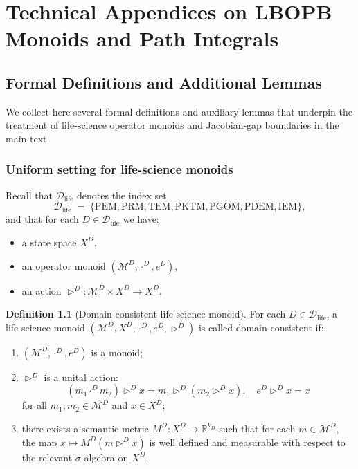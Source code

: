 \documentclass[11pt]{book}
\theoremstyle{plain}
\theoremstyle{definition}
\newtheorem{definition}[theorem]{Definition}
\theoremstyle{remark}
\begin{document}
\appendix

\chapter{Technical Appendices on LBOPB Monoids and Path Integrals}


\section{Formal Definitions and Additional Lemmas}


We collect here several formal definitions and auxiliary lemmas that
underpin the treatment of life-science operator monoids and
Jacobian-gap boundaries in the main text.

\subsection*{Uniform setting for life-science monoids}

Recall that $\mathcal{D}_{\mathrm{life}}$ denotes the index set
\[
  \mathcal{D}_{\mathrm{life}}
  \;=\;
  \{\mathrm{PEM}, \mathrm{PRM}, \mathrm{TEM}, \mathrm{PKTM},
    \mathrm{PGOM}, \mathrm{PDEM}, \mathrm{IEM}\},
\]
and that for each $D \in \mathcal{D}_{\mathrm{life}}$ we have:

\begin{itemize}
  \item a state space $X^{D}$,
  \item an operator monoid $(\mathcal{M}^{D},\cdot^{D}, e^{D})$,
  \item an action $\triangleright^{D} \colon \mathcal{M}^{D} \times X^{D}
        \to X^{D}$.
\end{itemize}

\begin{definition}[Domain-consistent life-science monoid]
For each $D \in \mathcal{D}_{\mathrm{life}}$, a life-science monoid
$(\mathcal{M}^{D}, X^{D}, \cdot^{D}, e^{D}, \triangleright^{D})$ is
called domain-consistent if:
\begin{enumerate}
  \item $(\mathcal{M}^{D},\cdot^{D}, e^{D})$ is a monoid;
  \item $\triangleright^{D}$ is a unital action:
        \[
          (m_{1} \cdot^{D} m_{2}) \triangleright^{D} x
          = m_{1} \triangleright^{D}
            (m_{2} \triangleright^{D} x),
          \quad
          e^{D} \triangleright^{D} x = x
        \]
        for all $m_{1},m_{2} \in \mathcal{M}^{D}$ and $x \in X^{D}$;
  \item there exists a semantic metric
        $M^{D} \colon X^{D} \to \mathbb{R}^{k_{D}}$ such that for each
        $m \in \mathcal{M}^{D}$, the map
        $x \mapsto M^{D}(m \triangleright^{D} x)$ is well defined
        and measurable with respect to the relevant $\sigma$-algebra
        on $X^{D}$.
\end{enumerate}
\end{definition}
\end{document}
